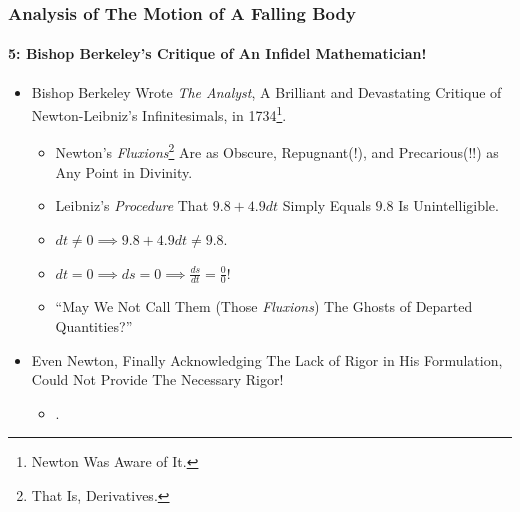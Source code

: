 \begin{frame}
\frametitle{Analysis of The Motion of \alert{A Falling Body}}
\framesubtitle{5: Bishop Berkeley's Critique of An \alert{Infidel Mathematician}!}
\label{slide:analysis-of-falling-body-5}
\begin{itemize}
\item Bishop Berkeley Wrote \alert{\textit{The Analyst}}, A Brilliant and Devastating Critique of Newton-Leibniz's Infinitesimals, in 1734\footnote{\tiny Newton Was Aware of It.}.
\begin{itemize}
\pause
\item Newton's \textit{Fluxions}\footnote{\tiny That Is, Derivatives.} Are as \alert{Obscure, Repugnant(!), and Precarious(!!)} as Any Point in Divinity. 
\pause
\item Leibniz's \textit{Procedure} That $9.8+4.9dt$ Simply Equals $9.8$ \alert{Is Unintelligible}.
\pause
\item $dt\ne0\implies 9.8+4.9dt\ne 9.8$.
\item $dt=0\implies ds=0\implies \frac{ds}{dt}=\frac{0}{0}$!
\pause
\item ``May We Not Call Them (Those \textit{Fluxions}) \alert{The Ghosts of Departed Quantities?}''
\end{itemize}
\pause
\item Even Newton, Finally Acknowledging \alert{The Lack of Rigor in His Formulation}, Could Not Provide The Necessary Rigor!
\begin{itemize}
\pause
\item {}.
\end{itemize}
\end{itemize}
\end{frame}
